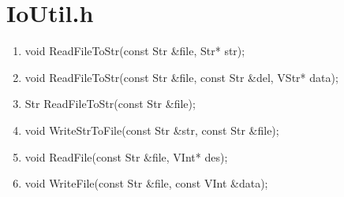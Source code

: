 \section{IoUtil.h}
\begin{enumerate}
\item void ReadFileToStr(const Str \&file, Str* str);
\item void ReadFileToStr(const Str \&file, const Str \&del, VStr* data);
\item Str ReadFileToStr(const Str \&file);
\item void WriteStrToFile(const Str \&str, const Str \&file);
\item void ReadFile(const Str \&file, VInt* des);
\item void WriteFile(const Str \&file, const VInt \&data);
\end{enumerate}
